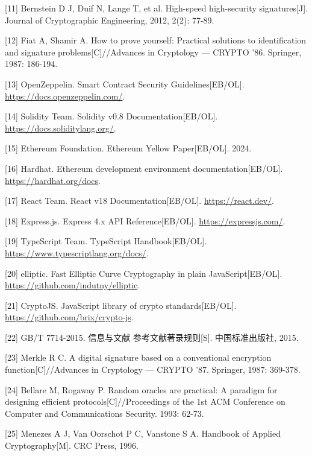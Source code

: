 \documentclass[UTF8,a4paper,zihao=-4,openany]{ctexrep}
\begin{document}
[11] Bernstein D J, Duif N, Lange T, et al. High-speed high-security signatures[J]. Journal of Cryptographic Engineering, 2012, 2(2): 77-89.

[12] Fiat A, Shamir A. How to prove yourself: Practical solutions to identification and signature problems[C]//Advances in Cryptology — CRYPTO '86. Springer, 1987: 186-194.

[13] OpenZeppelin. Smart Contract Security Guidelines[EB/OL]. \url{https://docs.openzeppelin.com/}.

[14] Solidity Team. Solidity v0.8 Documentation[EB/OL]. \url{https://docs.soliditylang.org/}.

[15] Ethereum Foundation. Ethereum Yellow Paper[EB/OL]. 2024.

[16] Hardhat. Ethereum development environment documentation[EB/OL]. \url{https://hardhat.org/docs}.

[17] React Team. React v18 Documentation[EB/OL]. \url{https://react.dev/}.

[18] Express.js. Express 4.x API Reference[EB/OL]. \url{https://expressjs.com/}.

[19] TypeScript Team. TypeScript Handbook[EB/OL]. \url{https://www.typescriptlang.org/docs/}.

[20] elliptic. Fast Elliptic Curve Cryptography in plain JavaScript[EB/OL]. \url{https://github.com/indutny/elliptic}.

[21] CryptoJS. JavaScript library of crypto standards[EB/OL]. \url{https://github.com/brix/crypto-js}.

[22] GB/T 7714-2015. 信息与文献 参考文献著录规则[S]. 中国标准出版社, 2015.

[23] Merkle R C. A digital signature based on a conventional encryption function[C]//Advances in Cryptology — CRYPTO '87. Springer, 1987: 369-378.

[24] Bellare M, Rogaway P. Random oracles are practical: A paradigm for designing efficient protocols[C]//Proceedings of the 1st ACM Conference on Computer and Communications Security. 1993: 62-73.

[25] Menezes A J, Van Oorschot P C, Vanstone S A. Handbook of Applied Cryptography[M]. CRC Press, 1996.
\end{document}
